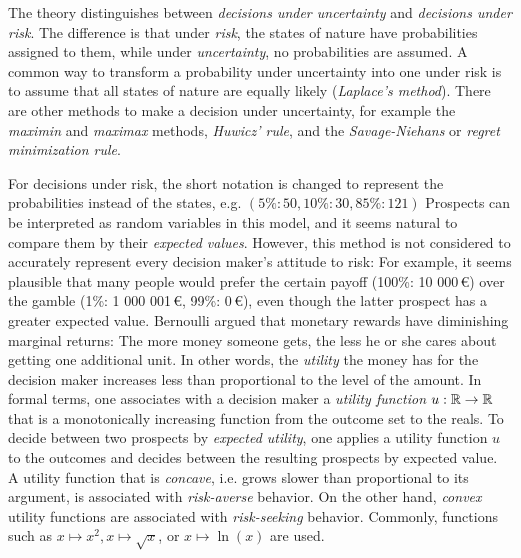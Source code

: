 \documentclass[a4paper,DIV=11,abstracton,twoside=semi]{scrreprt}
\theoremstyle{definition}
\begin{document}
    The theory distinguishes between \emph{decisions under uncertainty} and \emph{decisions under risk}. The difference is that under \emph{risk}, the states of nature have probabilities assigned to them, while under \emph{uncertainty}, no probabilities are assumed.
    A common way to transform a probability under uncertainty into one under risk is to assume that all states of nature are equally likely (\emph{Laplace's method}).
    There are other methods to make a decision under uncertainty, for example the \emph{maximin} and \emph{maximax} methods, \emph{Huwicz' rule}, and the \emph{Savage-Niehans} or \emph{regret minimization rule}. \cite[Section 4]{bib:doersamGrundlagenDerEntscheidungstheorie}
    
    For decisions under risk, the short notation is changed to represent the probabilities instead of the states, e.g. $(5\%: 50, 10\%: 30, 85\%: 121)$
    Prospects can be interpreted as random variables in this model, and it seems natural to compare them by their \emph{expected values}. However, this method is not considered to accurately represent every decision maker's attitude to risk:
    For example, it seems plausible that many people would prefer the certain payoff (100\%: 10 000\,\euro) over the gamble (1\%:  1 000 001\,\euro, 99\%:  0\,\euro), even though the latter prospect has a greater expected value.
    Bernoulli argued that monetary rewards have diminishing marginal returns: The more money someone gets, the less he or she cares about getting one additional unit. In other words, the \emph{utility} the money has for the decision maker increases less than proportional to the level of the amount.
    In formal terms, one associates with a decision maker a \emph{utility function} $u: \mathbb{R} \to \mathbb{R}$ that is a monotonically increasing function from the outcome set to the reals.
    To decide between two prospects by \emph{expected utility}, one applies a utility function $u$ to the outcomes and decides between the resulting prospects by expected value.
    A utility function that is \emph{concave}, i.e. grows slower than proportional to its argument, is associated with \emph{risk-averse} behavior.
    On the other hand, \emph{convex} utility functions are associated with \emph{risk-seeking} behavior. Commonly, functions such as $x \mapsto x^2, x \mapsto \sqrt{x}$, or $x \mapsto \ln(x)$ are used.
     \cites[Sections 2.1, 2.2]{bib:wakkerProspectTheory}[Section 5]{bib:doersamGrundlagenDerEntscheidungstheorie}
    
\end{document}
